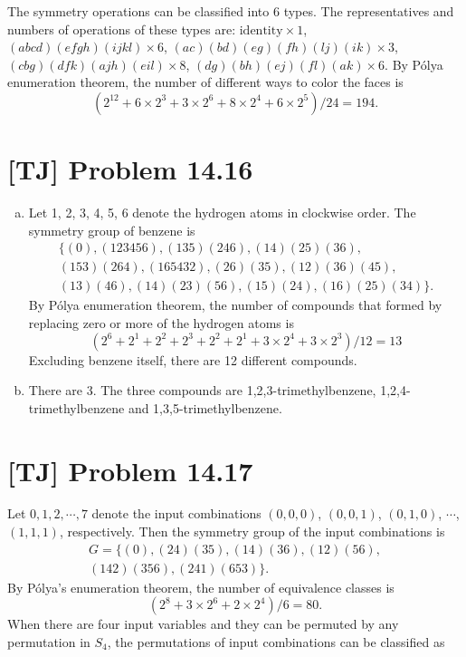 \documentclass[a4paper,11pt,twocolumn]{article}
\begin{document}
  The symmetry operations can be classified into 6 types. The representatives and numbers of operations of these types are: $\text{identity} \times 1$, $(abcd)(efgh)(ijkl) \times 6$, $(ac)(bd)(eg)(fh)(lj)(ik) \times 3$, $(cbg)(dfk)(ajh)(eil) \times 8$, $(dg)(bh)(ej)(fl)(ak) \times 6$. By P\'{o}lya enumeration theorem, the number of different ways to color the faces is
  $$ (2^12 + 6 \times 2^3 + 3 \times 2^6 + 8 \times 2^4 + 6 \times 2^5) / 24 = 194.$$

  \section{[TJ] Problem 14.16}
  \begin{enumerate}[(a)]
    \item Let 1, 2, 3, 4, 5, 6 denote the hydrogen atoms in clockwise order. The symmetry group of benzene is
        \begin{multline*}
          \{(0), (123456), (135)(246), (14)(25)(36), \\
          (153)(264), (165432), (26)(35), (12)(36)(45), \\
          (13)(46), (14)(23)(56), (15)(24), (16)(25)(34)\}.
        \end{multline*}
        By P\'{o}lya enumeration theorem, the number of compounds that formed by replacing zero or more of the hydrogen atoms is
        $$ (2^6 + 2^1 + 2^2 + 2^3 + 2^2 + 2^1 + 3 \times 2^4 + 3 \times 2^3) / 12 = 13 $$
        Excluding benzene itself, there are 12 different compounds.
    \item There are 3. The three compounds are 1,2,3-trimethylbenzene, 1,2,4-trimethylbenzene and 1,3,5-trimethylbenzene.
  \end{enumerate}

  \section{[TJ] Problem 14.17}
  Let $0, 1, 2, \cdots, 7$ denote the input combinations $(0,0,0)$, $(0,0,1)$, $(0,1,0)$, $\cdots$, $(1,1,1)$, respectively. Then the symmetry group of the input combinations is
  \begin{multline*}
   G = \{(0), (24)(35), (14)(36), (12)(56), \\
    (142)(356), (241)(653)\}.
  \end{multline*}
  By P\'{o}lya's enumeration theorem, the number of equivalence classes is
  $$ (2^8 + 3\times 2^6 + 2\times 2^4)/6 = 80. $$
  When there are four input variables and they can be permuted by any permutation in $S_4$, the permutations of input combinations can be classified as
\end{document}
